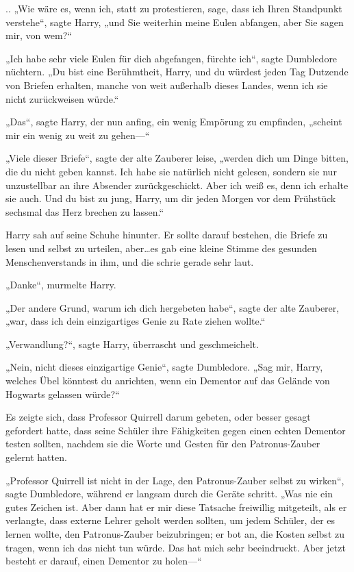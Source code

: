{.. „Wie wäre es, wenn ich, statt zu protestieren, sage, dass ich Ihren Standpunkt verstehe“, sagte Harry, „und Sie weiterhin meine Eulen abfangen, aber Sie sagen mir, von wem?“

„Ich habe sehr viele Eulen für dich abgefangen, fürchte ich“, sagte Dumbledore nüchtern. „Du bist eine Berühmtheit, Harry, und du würdest jeden Tag Dutzende von Briefen erhalten, manche von weit außerhalb dieses Landes, wenn ich sie nicht zurückweisen würde.“

„Das“, sagte Harry, der nun anfing, ein wenig Empörung zu empfinden, „scheint mir ein wenig zu weit zu gehen—“

„Viele dieser Briefe“, sagte der alte Zauberer leise, „werden dich um Dinge bitten, die du nicht geben kannst. Ich habe sie natürlich nicht gelesen, sondern sie nur unzustellbar an ihre Absender zurückgeschickt. Aber ich weiß es, denn ich erhalte sie auch. Und du bist zu jung, Harry, um dir jeden Morgen vor dem Frühstück sechsmal das Herz brechen zu lassen.“

Harry sah auf seine Schuhe hinunter. Er sollte darauf bestehen, die Briefe zu lesen und selbst zu urteilen, aber…es gab eine kleine Stimme des gesunden Menschenverstands in ihm, und die schrie gerade sehr laut.

„Danke“, murmelte Harry.

„Der andere Grund, warum ich dich hergebeten habe“, sagte der alte Zauberer, „war, dass ich dein einzigartiges Genie zu Rate ziehen wollte.“

„Verwandlung?“, sagte Harry, überrascht und geschmeichelt.

„Nein, nicht dieses einzigartige Genie“, sagte Dumbledore. „Sag mir, Harry, welches Übel könntest du anrichten, wenn ein Dementor auf das Gelände von Hogwarts gelassen würde?“

Es zeigte sich, dass Professor Quirrell darum gebeten, oder besser gesagt gefordert hatte, dass seine Schüler ihre Fähigkeiten gegen einen echten Dementor testen sollten, nachdem sie die Worte und Gesten für den Patronus-Zauber gelernt hatten.

„Professor Quirrell ist nicht in der Lage, den Patronus-Zauber selbst zu wirken“, sagte Dumbledore, während er langsam durch die Geräte schritt. „Was nie ein gutes Zeichen ist. Aber dann hat er mir diese Tatsache freiwillig mitgeteilt, als er verlangte, dass externe Lehrer geholt werden sollten, um jedem Schüler, der es lernen wollte, den Patronus-Zauber beizubringen; er bot an, die Kosten selbst zu tragen, wenn ich das nicht tun würde. Das hat mich sehr beeindruckt. Aber jetzt besteht er darauf, einen Dementor zu holen—“

}
